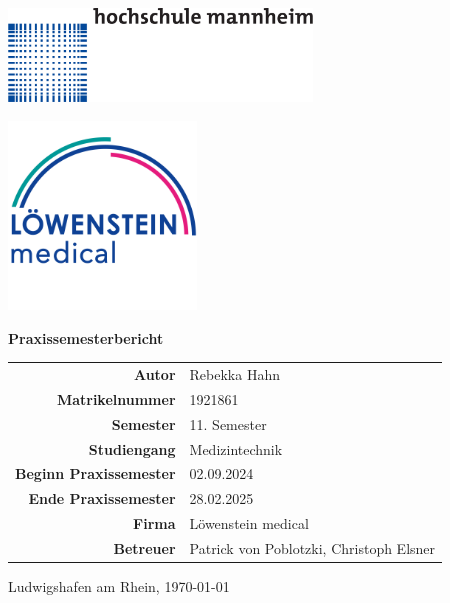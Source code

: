 \documentclass[a4paper, 12pt]{article}
\begin{document}
\begin{titlepage}
	\centering

    \begin{minipage}{0.1\textwidth}
        \includegraphics[height=2.5cm]
        {Hochschule_Mannheim_logo.png}
    \end{minipage}
    \hfill 
    \begin{minipage}{0.33\textwidth}
        \includegraphics[height=5cm]
        {loewenstein_logo.png}
    \end{minipage}	

    \vspace{2.5cm}
	
	{\Huge\bfseries Praxissemesterbericht \par}
    \vspace{2cm} %

    \begin{tabular}{ r  l }
        \textbf{Autor} & Rebekka Hahn \\
        \textbf{Matrikelnummer} & 1921861 \\
        \textbf{Semester} & 11. Semester \\
        \textbf{Studiengang} & Medizintechnik \\
        \textbf{Beginn Praxissemester} & 02.09.2024 \\
        \textbf{Ende Praxissemester} & 28.02.2025 \\
        \textbf{Firma} & Löwenstein medical \\
        \textbf{Betreuer} & Patrick von Poblotzki, Christoph Elsner \\
    \end{tabular}
    
    \vfill

    {\large Ludwigshafen am Rhein, \today \par}

\end{titlepage}
\end{document}
